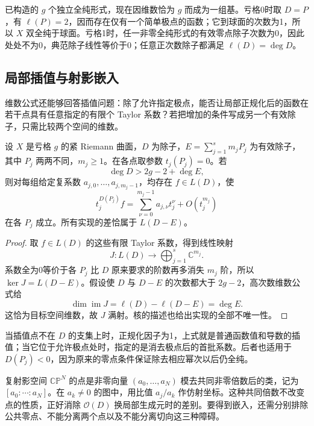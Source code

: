 \ProseParagraphBreak
{}已构造的 \(g\) 个独立全纯形式，现在因维数恰为 \(g\) 而成为一组基。亏格0时取 \(D=P\)，有 \(\ell(P)=2\)，因而存在仅有一个简单极点的函数；它到球面的次数为1，所以 \(X\) 双全纯于球面。亏格1时，任一非零全纯形式的有效零点除子次数为0，因此处处不为0，典范除子线性等价于0；任意正次数除子都满足 \(\ell(D)=\deg D\)。

\subsection{局部插值与射影嵌入}
\label{b3:subsec:A0603}

维数公式还能够回答插值问题：除了允许指定极点，能否让局部正规化后的函数在若干点具有任意指定的有限个 Taylor 系数？若把增加的条件写成另一个有效除子，只需比较两个空间的维数。

\begin{proposition}[有限阶局部插值]\label{b3:prop:A-jet-interpolation}
设 \(X\) 是亏格 \(g\) 的紧 Riemann 曲面，\(D\) 为除子，\(E=\sum_{j=1}^s m_jP_j\) 为有效除子，其中 \(P_j\) 两两不同，\(m_j\ge1\)。在各点取参数 \(t_j(P_j)=0\)。若
\[
 \deg D>2g-2+\deg E,
\]
则对每组给定复系数 \(a_{j,0},\ldots,a_{j,m_j-1}\)，均存在 \(f\in L(D)\)，使
\[
 t_j^{D(P_j)}f
 =\sum_{\nu=0}^{m_j-1}a_{j,\nu}t_j^\nu+O(t_j^{m_j})
\]
在各 \(P_j\) 成立。所有实现的差恰属于 \(L(D-E)\)。
\end{proposition}
\begin{proof}
取 \(f\in L(D)\) 的这些有限 Taylor 系数，得到线性映射
\[
 J:L(D)\longrightarrow\bigoplus_{j=1}^s\mathbb C^{m_j}.
\]
系数全为0等价于各 \(P_j\) 比 \(D\) 原来要求的阶数再多消失 \(m_j\) 阶，所以 \(\ker J=L(D-E)\)。假设使 \(D\) 与 \(D-E\) 的次数都大于 \(2g-2\)，高次数维数公式给
\[
 \dim\operatorname{im}J=\ell(D)-\ell(D-E)=\deg E.
\]
这恰为目标空间维数，故 \(J\) 满射。核的描述也给出实现的全部不唯一性。
\end{proof}

当插值点不在 \(D\) 的支集上时，正规化因子为1，上式就是普通函数值和导数的插值；当它位于允许极点处时，指定的是消去极点后的首批系数。后者也适用于 \(D(P_j)<0\)，因为原来的零点条件保证除去相应幂次以后仍全纯。

\ProseParagraphBreak
复射影空间 \(\mathbb{CP}^N\) 的点是非零向量 \((a_0,\ldots,a_N)\) 模去共同非零倍数后的类，记为 \([a_0:\cdots:a_N]\)。在 \(a_k\ne0\) 的图中，用比值 \(a_j/a_k\) 作仿射坐标。这种共同倍数不改变点的性质，正好消除 \(\mathcal O(D)\) 换局部生成元时的差别。要得到嵌入，还需分别排除公共零点、不能分离两个点以及不能分离切向这三种障碍。


